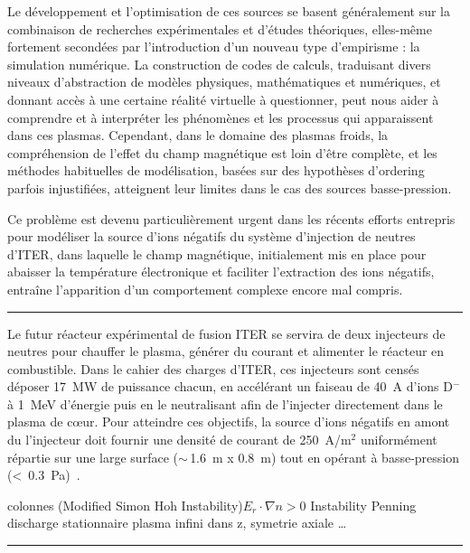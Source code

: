 \begin{refsection}
Le développement et l'optimisation de ces sources se basent généralement sur la
combinaison de recherches expérimentales et d'études théoriques, elles-même
fortement secondées par l'introduction d'un nouveau type d'empirisme : la
simulation numérique.
La construction de codes de calculs, traduisant divers niveaux d'abstraction de
modèles physiques, mathématiques et numériques, et donnant accès à une
certaine réalité virtuelle à questionner, peut nous aider à
comprendre et à interpréter les phénomènes et les processus qui apparaissent dans ces
plasmas. Cependant, dans le domaine des plasmas froids, la compréhension de
l'effet du champ magnétique est loin d'être complète, et les méthodes
habituelles de modélisation, basées sur des hypothèses d'ordering parfois
injustifiées, atteignent leur limites dans le cas des sources basse-pression. 

Ce
problème est devenu particulièrement urgent dans les récents efforts entrepris pour modéliser
la source d'ions négatifs du système d'injection de neutres d'ITER, dans
laquelle le champ magnétique, initialement mis en place pour abaisser la
température électronique et faciliter l'extraction des ions négatifs, entraîne
l'apparition d'un comportement complexe encore mal compris.

\begin{center}
\rule{0.6\textwidth}{1pt}
\end{center}

Le futur réacteur expérimental de fusion ITER se servira de deux injecteurs de
neutres pour chauffer le plasma, générer du courant et alimenter le réacteur en
combustible. Dans le cahier des charges d'ITER, ces injecteurs
sont censés déposer 17~MW de puissance chacun, en accélérant un
faiseau de 40~A d'ions D$^-$ à 1~MeV d'énergie puis en le neutralisant afin de
l'injecter directement dans le plasma de c\oe ur. Pour atteindre ces objectifs,
la source d'ions négatifs en amont du l'injecteur doit fournir
une densité de courant de 250~A/m$^2$ uniformément répartie sur une large
surface ($\sim\,$1.6~m x 0.8~m) tout en opérant à basse-pression
(<~0.3~Pa)~\parencite{Hemsworth,SimoninHDR}.

colonnes
\parencite{RosenbluthSimon}
\parencite{Sakawa} (Modified Simon Hoh Instability)$E_r\cdot\nabla n > 0$
\parencite{Hoh} Instability Penning discharge
\parencite{Fruchtman} stationnaire
\parencite{Sternberg} plasma infini dans z, symetrie axiale \ldots 

\begin{center}
\rule{0.6\textwidth}{1pt}
\end{center}


\end{refsection}
